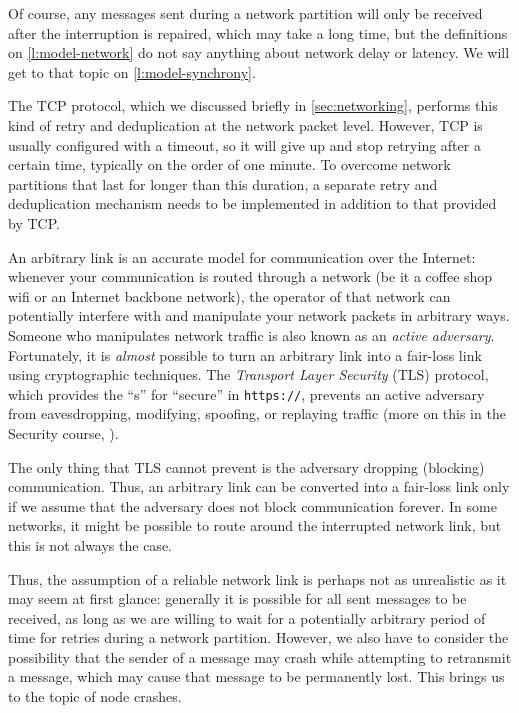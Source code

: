 Of course, any messages sent during a network partition will only be received after the interruption is repaired, which may take a long time, but the definitions on \autoref{l:model-network} do not say anything about network delay or latency.
We will get to that topic on \autoref{l:model-synchrony}.

The TCP protocol, which we discussed briefly in \autoref{sec:networking}, performs this kind of retry and deduplication at the network packet level.
However, TCP is usually configured with a timeout, so it will give up and stop retrying after a certain time, typically on the order of one minute.
To overcome network partitions that last for longer than this duration, a separate retry and deduplication mechanism needs to be implemented in addition to that provided by TCP.

An arbitrary link is an accurate model for communication over the Internet: whenever your communication is routed through a network (be it a coffee shop wifi or an Internet backbone network), the operator of that network can potentially interfere with and manipulate your network packets in arbitrary ways.
Someone who manipulates network traffic is also known as an \emph{active adversary}.
Fortunately, it is \emph{almost} possible to turn an arbitrary link into a fair-loss link using cryptographic techniques.
The \emph{Transport Layer Security} (TLS) protocol, which provides the ``s'' for ``secure'' in \verb|https://|, prevents an active adversary from eavesdropping, modifying, spoofing, or replaying traffic (more on this in the Security course, \whenissecurity).

The only thing that TLS cannot prevent is the adversary dropping (blocking) communication.
Thus, an arbitrary link can be converted into a fair-loss link only if we assume that the adversary does not block communication forever.
In some networks, it might be possible to route around the interrupted network link, but this is not always the case.

Thus, the assumption of a reliable network link is perhaps not as unrealistic as it may seem at first glance: generally it is possible for all sent messages to be received, as long as we are willing to wait for a potentially arbitrary period of time for retries during a network partition.
However, we also have to consider the possibility that the sender of a message may crash while attempting to retransmit a message, which may cause that message to be permanently lost.
This brings us to the topic of node crashes.

